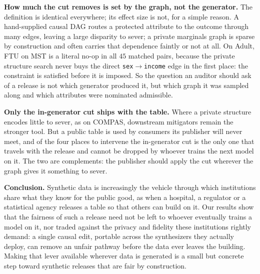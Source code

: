 {\textbf{How much the cut removes is set by the graph, not the generator.} The
definition is identical everywhere; its effect size is not, for a simple
reason. A hand-supplied causal DAG routes a protected attribute to the outcome
through many edges, leaving a large disparity to sever; a private marginals
graph is sparse by construction and often carries that dependence faintly or
not at all. On Adult, FTU on MST is a literal no-op in all $45$ matched pairs,
because the private structure search never buys the direct
\texttt{sex}$\rightarrow$\texttt{income} edge in the first place: the
constraint is satisfied before it is imposed. So the question an auditor should
ask of a release is not which generator produced it, but which graph it was
sampled along and which attributes were nominated admissible.

\textbf{Only the in-generator cut ships with the table.} Where a private
structure encodes little to sever, as on COMPAS, downstream mitigators remain
the stronger tool. But a public table is used by consumers its publisher will
never meet, and of the four places to intervene the in-generator cut is the
only one that travels with the release and cannot be dropped by whoever trains
the next model on it. The two are complements: the publisher should apply the
cut wherever the graph gives it something to sever.

\textbf{Conclusion.} Synthetic data is increasingly the vehicle through which
institutions share what they know for the public good, as when a hospital, a
regulator or a statistical agency releases a table so that others can build on
it. Our results show that the fairness of such a release need not be left to
whoever eventually trains a model on it, nor traded against the privacy and
fidelity these institutions rightly demand: a single causal edit, portable
across the synthesizers they actually deploy, can remove an unfair pathway
before the data ever leaves the building. Making that lever available wherever
data is generated is a small but concrete step toward synthetic releases that
are fair by construction.%
}
